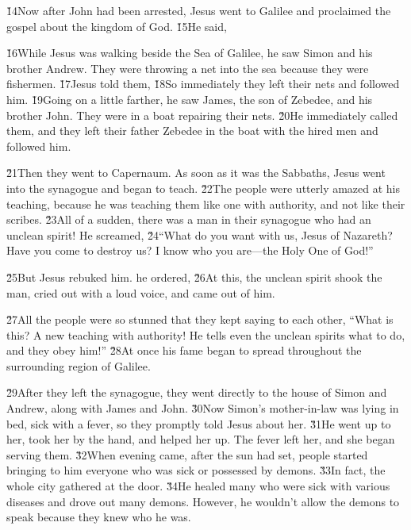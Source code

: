 \v{14}Now after John had been arrested, Jesus went to Galilee and proclaimed the gospel about the kingdom of God. \v{15}He said, 

\v{16}While Jesus was walking beside the Sea of Galilee, he saw Simon and his brother Andrew. They were throwing a net into the sea because they were fishermen. \v{17}Jesus told them,  \v{18}So immediately they left their nets and followed him. \v{19}Going on a little farther, he saw James, the son of Zebedee, and his brother John. They were in a boat repairing their nets. \v{20}He immediately called them, and they left their father Zebedee in the boat with the hired men and followed him.

\v{21}Then they went to Capernaum. As soon as it was the Sabbaths, Jesus went into the synagogue and began to teach. \v{22}The people were utterly amazed at his teaching, because he was teaching them like one with authority, and not like their scribes. \v{23}All of a sudden, there was a man in their synagogue who had an unclean spirit! He screamed, \v{24}``What do you want with us, Jesus of Nazareth? Have you come to destroy us? I know who you are---the Holy One of God!''

\v{25}But Jesus rebuked him.  he ordered,  \v{26}At this, the unclean spirit shook the man, cried out with a loud voice, and came out of him.

\v{27}All the people were so stunned that they kept saying to each other, ``What is this? A new teaching with authority! He tells even the unclean spirits what to do, and they obey him!'' \v{28}At once his fame began to spread throughout the surrounding region of Galilee.

\v{29}After they left the synagogue, they went directly to the house of Simon and Andrew, along with James and John. \v{30}Now Simon's mother-in-law was lying in bed, sick with a fever, so they promptly told Jesus about her. \v{31}He went up to her, took her by the hand, and helped her up. The fever left her, and she began serving them. \v{32}When evening came, after the sun had set, people started bringing to him everyone who was sick or possessed by demons. \v{33}In fact, the whole city gathered at the door. \v{34}He healed many who were sick with various diseases and drove out many demons. However, he wouldn't allow the demons to speak because they knew who he was.

